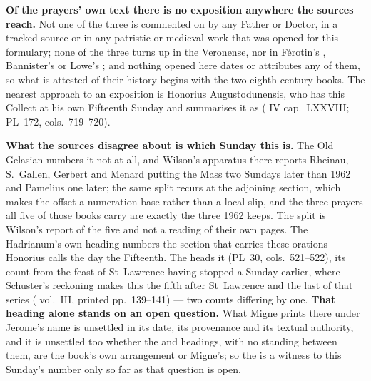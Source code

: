 \textbf{Of the prayers' own text there is no exposition anywhere the sources
reach.} Not one of the three is commented on by any Father or Doctor, in a
tracked source or in any patristic or medieval work that was opened for this
formulary; none of the three turns up in the Veronense, nor in Férotin's
, Bannister's  or
Lowe's ; and nothing opened here dates or attributes any
of them, so what is attested of their history begins with the two
eighth-century books. The nearest approach to an exposition is Honorius
Augustodunensis, who has this Collect at his own Fifteenth Sunday and
summarises it as  ( IV cap.~LXXVIII; PL~172, cols.\ 719--720).

\textbf{What the sources disagree about is which Sunday this is.} The Old
Gelasian numbers it not at all, and Wilson's apparatus there reports Rheinau,
S.~Gallen, Gerbert and Menard putting the Mass two Sundays later than 1962 and
Pamelius one later; the same split recurs at the adjoining section, which
makes the offset a numeration base rather than a local slip, and the three
prayers all five of those books carry are exactly the three 1962 keeps. The
split is Wilson's report of the five and not a reading of their own pages. The
Hadrianum's own heading numbers the section that carries these orations
 Honorius calls the day the Fifteenth. The  heads it  (PL~30, cols.\ 521--522), its
count from the feast of St~Lawrence having stopped a Sunday earlier, where
Schuster's reckoning makes this the fifth after St~Lawrence and the last of
that series ( vol.~III, printed pp.~139--141) --- two
counts differing by one. \textbf{That heading alone stands on an open
question.} What Migne prints there under Jerome's name is unsettled in its date,
its provenance and its textual authority, and it is unsettled too whether the
 and  headings, with no 
standing between them, are the book's own arrangement or Migne's; so the
 is a witness to this Sunday's number only so far as that
question is open.

